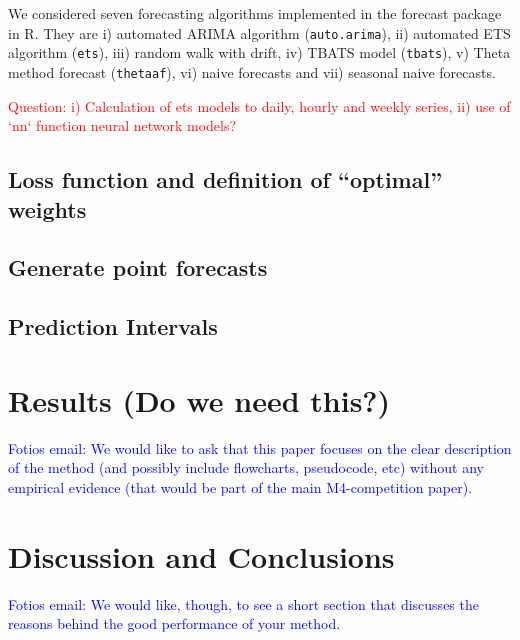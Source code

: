 \documentclass[11pt,a4paper,]{article}
\theoremstyle{definition}
\theoremstyle{definition}
\theoremstyle{definition}
\theoremstyle{remark}
\begin{document}
We considered seven forecasting algorithms implemented in the forecast
package in R. They are i) automated ARIMA algorithm
(\texttt{auto.arima}), ii) automated ETS algorithm (\texttt{ets}), iii)
random walk with drift, iv) TBATS model (\texttt{tbats}), v) Theta
method forecast (\texttt{thetaaf}), vi) naive forecasts and vii)
seasonal naive forecasts.

\textcolor{red}{Question: i) Calculation of ets models to daily, hourly and weekly series, ii) use of `nn` function neural network models?}

\subsection{\texorpdfstring{Loss function and definition of ``optimal''
weights}{Loss function and definition of optimal weights}}\label{loss-function-and-definition-of-optimal-weights}

\subsection{Generate point forecasts}\label{generate-point-forecasts}

\subsection{Prediction Intervals}\label{prediction-intervals}

\section{Results (Do we need this?)}\label{results-do-we-need-this}

\textcolor{blue}{ Fotios email: We would like to ask that this paper focuses on the clear description of the method (and possibly include flowcharts, pseudocode, etc) without any empirical evidence (that would be part of the main M4-competition paper). }

\section{Discussion and Conclusions}\label{discussion-and-conclusions}

\textcolor{blue}{Fotios email: We would like, though, to see a short section that discusses the reasons behind the good performance of your method. }

\printbibliography[title=References]
\end{document}
